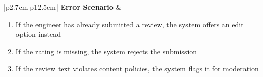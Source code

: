 \begin{table}[H]
\begin{tabular}{|p{2.7cm}|p{12.5cm}|}
            \hline
            \textbf{Error Scenario} & \begin{minipage}[t]{\linewidth}
                                          \begin{enumerate}[topsep=0pt,itemsep=1pt,parsep=0pt,partopsep=0pt]
                                              \item If the engineer has already submitted a review, the system offers an edit
                                                    option instead
                                              \item If the rating is missing, the system rejects the submission
                                              \item If the review text violates content policies, the system flags it for
                                                    moderation
                                          \end{enumerate}
                                      \end{minipage}               \\
            \hline
        \end{tabular}
        \label{tab:eng-write-review}
    \end{table}
